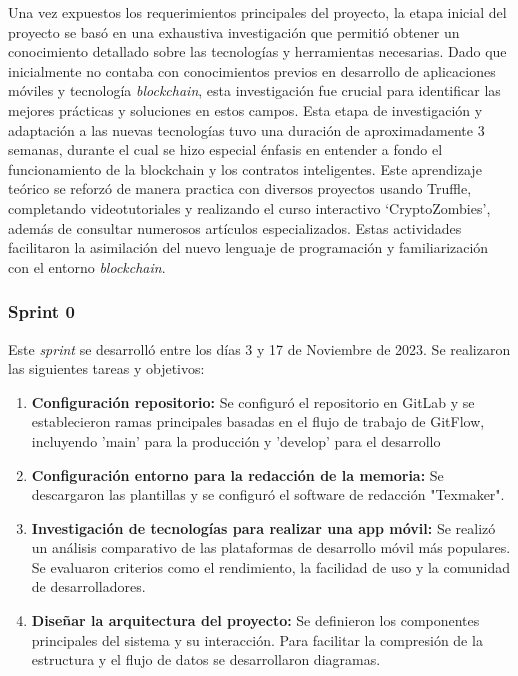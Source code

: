 Una vez expuestos los requerimientos principales del proyecto, la etapa inicial del proyecto se basó en una exhaustiva investigación que permitió obtener un conocimiento detallado sobre las tecnologías y herramientas necesarias. Dado que inicialmente no contaba con conocimientos previos en desarrollo de aplicaciones móviles y tecnología \textit{blockchain}, esta investigación fue crucial para identificar las mejores prácticas y soluciones en estos campos. 
Esta etapa de investigación y adaptación a las nuevas tecnologías tuvo una duración de aproximadamente 3 semanas, durante el cual se hizo especial énfasis en entender a fondo el funcionamiento de la blockchain y los contratos inteligentes.
Este aprendizaje teórico se reforzó de manera practica con diversos proyectos usando Truffle, completando videotutoriales y realizando el curso interactivo `CryptoZombies', además de consultar numerosos artículos especializados. Estas actividades facilitaron la asimilación del nuevo lenguaje de programación y familiarización con el entorno \textit{blockchain}.


\subsubsection{Sprint 0}

Este \textit{sprint} se desarrolló entre los días 3 y 17 de Noviembre de 2023. Se realizaron las siguientes tareas y objetivos:

\begin{enumerate}

\item \textbf{Configuración repositorio:} Se configuró el repositorio en GitLab y se establecieron ramas principales basadas en el flujo de trabajo de GitFlow, incluyendo 'main' para la producción y 'develop' para el desarrollo 

\item \textbf{Configuración entorno para la redacción de la memoria:} Se descargaron las plantillas y se configuró el software de redacción "Texmaker".

\item \textbf{Investigación de tecnologías para realizar una app móvil:} Se realizó un análisis comparativo de las plataformas de desarrollo móvil más populares. Se evaluaron criterios como el rendimiento, la facilidad de uso y la comunidad de desarrolladores.

\item \textbf{Diseñar la arquitectura del proyecto:} Se definieron los componentes principales del sistema y su interacción. Para facilitar la compresión de la estructura y el flujo de datos se desarrollaron diagramas.

\end{enumerate}


